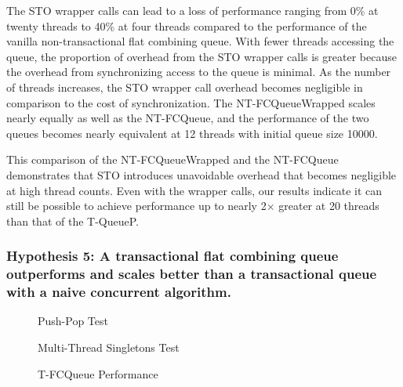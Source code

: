 The STO wrapper calls can lead to a loss of performance ranging from 0\% at twenty threads to 40\% at four threads compared to the performance of the vanilla non-transactional flat combining queue. 
 With fewer threads accessing the queue, the proportion of overhead from the STO wrapper calls is greater because the overhead from synchronizing access to the queue is minimal. As the number of threads increases, the STO wrapper call overhead becomes negligible in comparison to the cost of synchronization.
The NT-FCQueueWrapped scales nearly equally as well as the NT-FCQueue, and the performance of the two queues becomes nearly equivalent at 12 threads with initial queue size 10000.


This comparison of the NT-FCQueueWrapped and the NT-FCQueue demonstrates that STO introduces unavoidable overhead that becomes negligible at high thread counts. Even with the wrapper calls, our results indicate it can still be possible to achieve performance up to nearly 2$\times$ greater at 20 threads than that of the T-QueueP.

\vspace{12pt}
\noindent{}

\subsubsection{Hypothesis 5: A transactional flat combining queue outperforms and scales better than a transactional queue with a naive concurrent algorithm.}

\begin{figure}[H]
    \centering
	\begin{minipage}{0.75\textwidth}
        \caption*{Push-Pop Test}
        \vspace{12pt}
	\end{minipage}
   	\begin{minipage}{0.75\textwidth}
        \caption*{Multi-Thread Singletons Test}
	\end{minipage}
        \caption{T-FCQueue Performance}
    \label{fig:tqs}
\end{figure}

